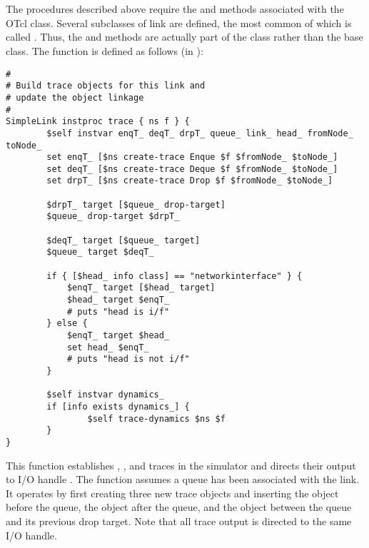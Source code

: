 \section{}

The  procedures described above require the 
and  methods associated with the OTcl  class.
Several subclasses of link are defined, the most common of which
is called .  Thus, the  and 
methods are actually part of the  class rather than
the  base class.
The  function is defined as follows (in ):
\begin{small}
\begin{verbatim}
#
# Build trace objects for this link and
# update the object linkage
#
SimpleLink instproc trace { ns f } {
        $self instvar enqT_ deqT_ drpT_ queue_ link_ head_ fromNode_ toNode_
        set enqT_ [$ns create-trace Enque $f $fromNode_ $toNode_]
        set deqT_ [$ns create-trace Deque $f $fromNode_ $toNode_]
        set drpT_ [$ns create-trace Drop $f $fromNode_ $toNode_]

        $drpT_ target [$queue_ drop-target]
        $queue_ drop-target $drpT_

        $deqT_ target [$queue_ target]
        $queue_ target $deqT_

        if { [$head_ info class] == "networkinterface" } {
            $enqT_ target [$head_ target]
            $head_ target $enqT_
            # puts "head is i/f"
        } else {
            $enqT_ target $head_
            set head_ $enqT_
            # puts "head is not i/f"
        }

        $self instvar dynamics_
        if [info exists dynamics_] {
                $self trace-dynamics $ns $f
        }
}

\end{verbatim}
\end{small}

This function establishes , , and 
traces in the simulator  and directs their
output to I/O handle .
The function assumes a queue has been associated with the link.
It operates by first creating three new trace objects
and inserting the  object before the queue, the
 object after the queue, and the  object
between the queue and its previous drop target.
Note that all trace output is directed to the same I/O handle.

